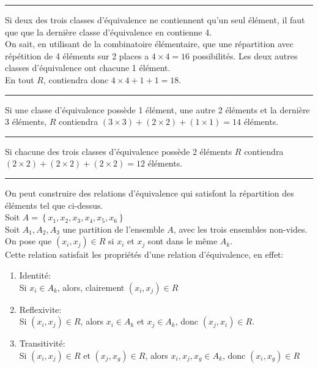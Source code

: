 \documentclass[11pt, a4paper]{article}
\newcommand\hr{
    \noindent\rule[0.5ex]{\linewidth}{0.5pt}\newline
}
\begin{document}
\hr
Si deux des trois classes d'équivalence ne contiennent qu'un seul élément, il faut que que la dernière classe d'équivalence en contienne 4.\\
On sait, en utilisant de la combinatoire élémentaire, que une répartition avec répétition de 4 éléments sur 2 places a  $4\times 4=16$ possibilités.
Les deux autres classes d'équivalence ont chacune 1 élément.\\
En tout $R$, contiendra donc $4\times 4 + 1 + 1=18$.\\
\hr
Si une classe d'équivalence possède 1 élément, une autre 2 éléments et la dernière 3 éléments, $R$ contiendra
$(3\times 3) + (2\times 2) + ( 1 \times 1 ) =14$ éléments.\\
\hr
Si chacune des trois classes d'équivalence possède 2 éléments $R$ contiendra
$ (2 \times 2) + (2 \times 2) +(2 \times 2) = 12$ éléments.\\
\hr
On peut construire des relations d'équivalence qui satisfont la répartition des éléments tel que ci-dessus.\\
Soit $A = \left\{ x_1,x_2,x_3,x_4,x_5,x_6 \right\} $\\
Soit $ A_1, A_2, A_3$	une partition de l'ensemble $A$, avec les trois ensembles non-vides.\\
On pose que $( x_i,x_j ) \in R$ si $x_i$ et $x_j$ sont dans le même $A_k$.\\
Cette relation satisfait les propriétés d'une relation d'équivalence, en effet:
\begin{enumerate}
	\item Identité:\\
		Si $x_i \in A_k$, alors, clairement $(x_i, x_j) \in R$
	\item Reflexivite:\\
		Si $( x_i,x_j) \in R $, alors $x_i \in A_k$ et $x_j \in A_k$, donc $(x_j, x_i) \in R$.
	\item Transitivité:\\
		Si $(x_i, x_j) \in R$ et $(x_j,x_g) \in R$, alors $x_i,x_j, x_g \in A_k$, donc $(x_i,x_g) \in R$
\end{enumerate}
\end{document}
